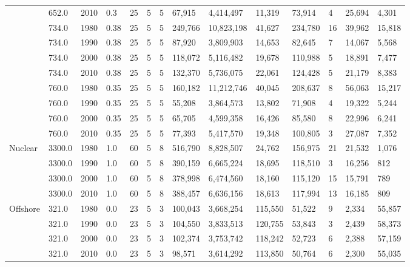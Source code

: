 \begin{table}[]
\begin{tabular}{|l|l|l|l|l|l|l|l|l|l|l|l|l|l|}
		& 652.0 & 2010 & 0.3 & 25 & 5 & 5 & 67,915 & 4,414,497 & 11,319 & 73,914 & 4 & 25,694 & 4,301 \\ \cline{2-14} 
		& 734.0 & 1980 & 0.38 & 25 & 5 & 5 & 249,766 & 10,823,198 & 41,627 & 234,780 & 16 & 39,962 & 15,818 \\ \cline{2-14} 
		& 734.0 & 1990 & 0.38 & 25 & 5 & 5 & 87,920 & 3,809,903 & 14,653 & 82,645 & 7 & 14,067 & 5,568 \\ \cline{2-14} 
		& 734.0 & 2000 & 0.38 & 25 & 5 & 5 & 118,072 & 5,116,482 & 19,678 & 110,988 & 5 & 18,891 & 7,477 \\ \cline{2-14} 
		& 734.0 & 2010 & 0.38 & 25 & 5 & 5 & 132,370 & 5,736,075 & 22,061 & 124,428 & 5 & 21,179 & 8,383 \\ \cline{2-14} 
		& 760.0 & 1980 & 0.35 & 25 & 5 & 5 & 160,182 & 11,212,746 & 40,045 & 208,637 & 8 & 56,063 & 15,217 \\ \cline{2-14} 
		& 760.0 & 1990 & 0.35 & 25 & 5 & 5 & 55,208 & 3,864,573 & 13,802 & 71,908 & 4 & 19,322 & 5,244 \\ \cline{2-14} 
		& 760.0 & 2000 & 0.35 & 25 & 5 & 5 & 65,705 & 4,599,358 & 16,426 & 85,580 & 8 & 22,996 & 6,241 \\ \cline{2-14} 
		& 760.0 & 2010 & 0.35 & 25 & 5 & 5 & 77,393 & 5,417,570 & 19,348 & 100,805 & 3 & 27,087 & 7,352 \\ \hline
		\multirow{4}{*}{Nuclear} & 3300.0 & 1980 & 1.0 & 60 & 5 & 8 & 516,790 & 8,828,507 & 24,762 & 156,975 & 21 & 21,532 & 1,076 \\ \cline{2-14} 
		& 3300.0 & 1990 & 1.0 & 60 & 5 & 8 & 390,159 & 6,665,224 & 18,695 & 118,510 & 3 & 16,256 & 812 \\ \cline{2-14} 
		& 3300.0 & 2000 & 1.0 & 60 & 5 & 8 & 378,998 & 6,474,560 & 18,160 & 115,120 & 15 & 15,791 & 789 \\ \cline{2-14} 
		& 3300.0 & 2010 & 1.0 & 60 & 5 & 8 & 388,457 & 6,636,156 & 18,613 & 117,994 & 13 & 16,185 & 809 \\ \hline
		\multirow{8}{*}{Offshore} & 321.0 & 1980 & 0.0 & 23 & 5 & 3 & 100,043 & 3,668,254 & 115,550 & 51,522 & 9 & 2,334 & 55,857 \\ \cline{2-14} 
		& 321.0 & 1990 & 0.0 & 23 & 5 & 3 & 104,550 & 3,833,513 & 120,755 & 53,843 & 3 & 2,439 & 58,373 \\ \cline{2-14} 
		& 321.0 & 2000 & 0.0 & 23 & 5 & 3 & 102,374 & 3,753,742 & 118,242 & 52,723 & 6 & 2,388 & 57,159 \\ \cline{2-14} 
		& 321.0 & 2010 & 0.0 & 23 & 5 & 3 & 98,571 & 3,614,292 & 113,850 & 50,764 & 6 & 2,300 & 55,035 \\ \cline{2-14} 

\end{tabular}
\end{table}
